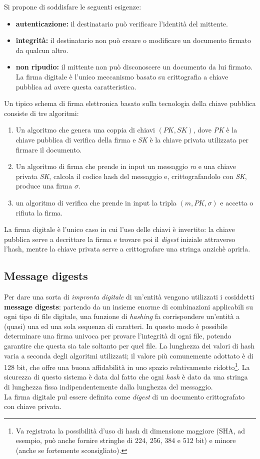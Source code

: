 Si propone di soddisfare le seguenti esigenze:
\begin{itemize}
	\item \textbf{autenticazione:} il destinatario può verificare l'identità del mittente.
	\item \textbf{integrità:} il destinatario non può creare o modificare un documento firmato da qualcun altro.
	\item \textbf{non ripudio:} il mittente non può disconoscere un documento da lui firmato. La firma digitale è l'unico meccanismo basato su crittografia a chiave pubblica ad avere questa caratteristica.	
\end{itemize}

Un tipico schema di firma elettronica basato sulla tecnologia della chiave pubblica consiste di tre algoritmi:
\begin{enumerate}
	\item Un algoritmo che genera una coppia di chiavi $ (PK, SK) $, dove \textit{PK} è la chiave pubblica di verifica della firma e \textit{SK} è la chiave privata utilizzata per firmare il documento.
	\item Un algoritmo di firma che prende in input un messaggio \textit{m} e una chiave privata \textit{SK}, calcola il codice hash del messaggio e, crittografandolo con \textit{SK}, produce una firma $ \sigma $.
	\item un algoritmo di verifica che prende in input la tripla $(m, PK, \sigma)$ e accetta o rifiuta la firma.
\end{enumerate}
La firma digitale è l'unico caso in cui l'uso delle chiavi è invertito: la chiave pubblica serve a decrittare la firma e trovare poi il \textit{digest} iniziale attraverso l'hash, mentre la chiave privata serve a crittografare una stringa anzichè aprirla.

\subsection{Message digests}
Per dare una sorta di \textit{impronta digitale} di un'entità vengono utilizzati i cosiddetti \textbf{message digests}: partendo da un insieme enorme di combinazioni applicabili su ogni tipo di file digitale, una funzione di \textit{hashing} fa corrispondere un'entità a (quasi) una ed una sola sequenza di caratteri. In questo modo è possibile determinare una firma univoca per provare l'integrità di ogni file, potendo garantire che questa sia tale soltanto per quel file. La lunghezza dei valori di hash varia a seconda degli algoritmi utilizzati; il valore più comunemente adottato è di 128 bit, che offre una buona affidabilità in uno spazio relativamente ridotto\footnote{Va registrata la possibilità d'uso di hash di dimensione maggiore (SHA, ad esempio, può anche fornire stringhe di 224, 256, 384 e 512 bit) e minore (anche se fortemente sconsigliato).}. La sicurezza di questo sistema è data dal fatto che ogni \textit{hash} è dato da una stringa di lunghezza fissa indipendentemente dalla lunghezza del messaggio.\\
La firma digitale pul essere definita come \textit{digest} di un documento crittografato con chiave privata.


